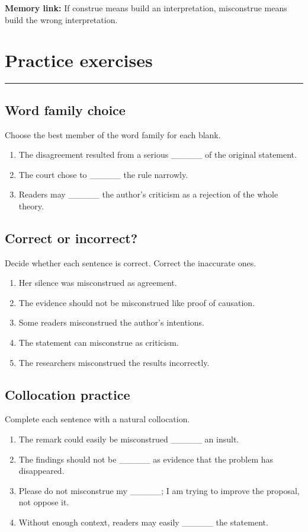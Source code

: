 \documentclass[11pt]{article}
\newcommand{\sectionrule}{\par\vspace{-0.5em}\noindent\textcolor{Accent}{\rule{\linewidth}{0.6pt}}\par}
\begin{document}
\textbf{Memory link:} If construe means build an interpretation, misconstrue means build the wrong interpretation.

\section{Practice exercises}
\sectionrule
\subsection{Word family choice}
Choose the best member of the word family for each blank.

\begin{enumerate}
  \item The disagreement resulted from a serious \_\_\_\_\_ of the original statement.
  \item The court chose to \_\_\_\_\_ the rule narrowly.
  \item Readers may \_\_\_\_\_ the author's criticism as a rejection of the whole theory.
\end{enumerate}

\subsection{Correct or incorrect?}
Decide whether each sentence is correct. Correct the inaccurate ones.

\begin{enumerate}
  \item Her silence was misconstrued as agreement.
  \item The evidence should not be misconstrued like proof of causation.
  \item Some readers misconstrued the author's intentions.
  \item The statement can misconstrue as criticism.
  \item The researchers misconstrued the results incorrectly.
\end{enumerate}

\subsection{Collocation practice}
Complete each sentence with a natural collocation.

\begin{enumerate}
  \item The remark could easily be misconstrued \_\_\_\_\_ an insult.
  \item The findings should not be \_\_\_\_\_ as evidence that the problem has disappeared.
  \item Please do not misconstrue my \_\_\_\_\_; I am trying to improve the proposal, not oppose it.
  \item Without enough context, readers may easily \_\_\_\_\_ the statement.
\end{enumerate}
\end{document}
